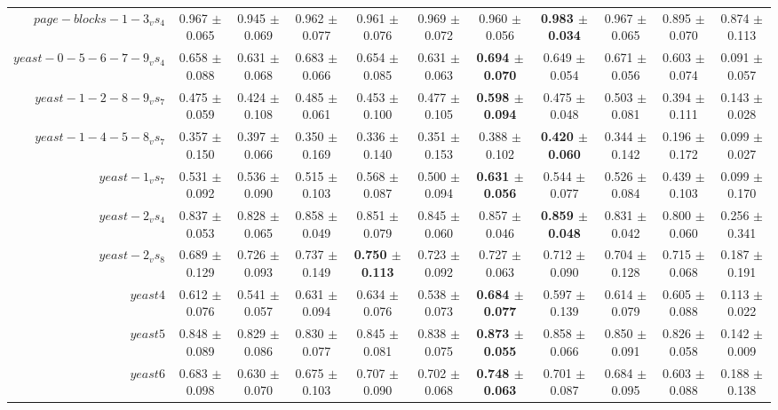 \begin{table}[!ht]
{\begin{tabular}{r c c c c c c c c c c}
$page-blocks-1-3_vs_4$ & 0.967 $\pm$ 0.065 & 0.945 $\pm$ 0.069 & 0.962 $\pm$ 0.077 & 0.961 $\pm$ 0.076 & 0.969 $\pm$ 0.072 & 0.960 $\pm$ 0.056 & \textbf{0.983 $\pm$ 0.034} & 0.967 $\pm$ 0.065 & 0.895 $\pm$ 0.070 & 0.874 $\pm$ 0.113 \\
$yeast-0-5-6-7-9_vs_4$ & 0.658 $\pm$ 0.088 & 0.631 $\pm$ 0.068 & 0.683 $\pm$ 0.066 & 0.654 $\pm$ 0.085 & 0.631 $\pm$ 0.063 & \textbf{0.694 $\pm$ 0.070} & 0.649 $\pm$ 0.054 & 0.671 $\pm$ 0.056 & 0.603 $\pm$ 0.074 & 0.091 $\pm$ 0.057 \\
$yeast-1-2-8-9_vs_7$ & 0.475 $\pm$ 0.059 & 0.424 $\pm$ 0.108 & 0.485 $\pm$ 0.061 & 0.453 $\pm$ 0.100 & 0.477 $\pm$ 0.105 & \textbf{0.598 $\pm$ 0.094} & 0.475 $\pm$ 0.048 & 0.503 $\pm$ 0.081 & 0.394 $\pm$ 0.111 & 0.143 $\pm$ 0.028 \\
$yeast-1-4-5-8_vs_7$ & 0.357 $\pm$ 0.150 & 0.397 $\pm$ 0.066 & 0.350 $\pm$ 0.169 & 0.336 $\pm$ 0.140 & 0.351 $\pm$ 0.153 & 0.388 $\pm$ 0.102 & \textbf{0.420 $\pm$ 0.060} & 0.344 $\pm$ 0.142 & 0.196 $\pm$ 0.172 & 0.099 $\pm$ 0.027 \\
$yeast-1_vs_7$ & 0.531 $\pm$ 0.092 & 0.536 $\pm$ 0.090 & 0.515 $\pm$ 0.103 & 0.568 $\pm$ 0.087 & 0.500 $\pm$ 0.094 & \textbf{0.631 $\pm$ 0.056} & 0.544 $\pm$ 0.077 & 0.526 $\pm$ 0.084 & 0.439 $\pm$ 0.103 & 0.099 $\pm$ 0.170 \\
$yeast-2_vs_4$ & 0.837 $\pm$ 0.053 & 0.828 $\pm$ 0.065 & 0.858 $\pm$ 0.049 & 0.851 $\pm$ 0.079 & 0.845 $\pm$ 0.060 & 0.857 $\pm$ 0.046 & \textbf{0.859 $\pm$ 0.048} & 0.831 $\pm$ 0.042 & 0.800 $\pm$ 0.060 & 0.256 $\pm$ 0.341 \\
$yeast-2_vs_8$ & 0.689 $\pm$ 0.129 & 0.726 $\pm$ 0.093 & 0.737 $\pm$ 0.149 & \textbf{0.750 $\pm$ 0.113} & 0.723 $\pm$ 0.092 & 0.727 $\pm$ 0.063 & 0.712 $\pm$ 0.090 & 0.704 $\pm$ 0.128 & 0.715 $\pm$ 0.068 & 0.187 $\pm$ 0.191 \\
$yeast4$ & 0.612 $\pm$ 0.076 & 0.541 $\pm$ 0.057 & 0.631 $\pm$ 0.094 & 0.634 $\pm$ 0.076 & 0.538 $\pm$ 0.073 & \textbf{0.684 $\pm$ 0.077} & 0.597 $\pm$ 0.139 & 0.614 $\pm$ 0.079 & 0.605 $\pm$ 0.088 & 0.113 $\pm$ 0.022 \\
$yeast5$ & 0.848 $\pm$ 0.089 & 0.829 $\pm$ 0.086 & 0.830 $\pm$ 0.077 & 0.845 $\pm$ 0.081 & 0.838 $\pm$ 0.075 & \textbf{0.873 $\pm$ 0.055} & 0.858 $\pm$ 0.066 & 0.850 $\pm$ 0.091 & 0.826 $\pm$ 0.058 & 0.142 $\pm$ 0.009 \\
$yeast6$ & 0.683 $\pm$ 0.098 & 0.630 $\pm$ 0.070 & 0.675 $\pm$ 0.103 & 0.707 $\pm$ 0.090 & 0.702 $\pm$ 0.068 & \textbf{0.748 $\pm$ 0.063} & 0.701 $\pm$ 0.087 & 0.684 $\pm$ 0.095 & 0.603 $\pm$ 0.088 & 0.188 $\pm$ 0.138 \\

\end{tabular}}
\end{table}
